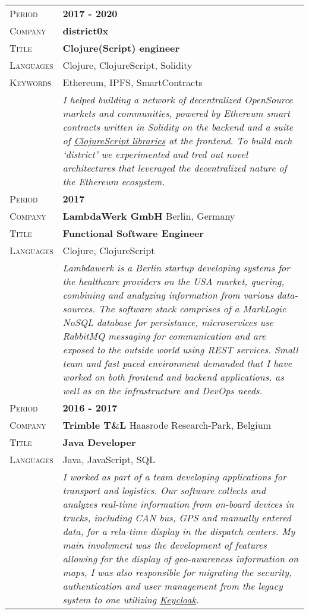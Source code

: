 \documentclass[a4paper, oneside, final]{scrartcl}
\newcommand{\gray}{\rowcolor[gray]{.90}}
\begin{document}
\begin{center}
\begin{tabularx}{1.0\linewidth}{>{\raggedleft\scshape}p{2cm}X}
\gray Period    & \textbf{2017 - 2020} \\
\gray Company  & \textbf{district0x} \\
\gray Title & \textbf{Clojure(Script) engineer} \\
\gray Languages & Clojure, ClojureScript, Solidity \\
\gray Keywords & Ethereum, IPFS, SmartContracts \\
\gray           &  {\textit{
    I helped building a network of decentralized OpenSource markets and communities, powered by Ethereum smart contracts written in Solidity on the backend and a suite of \href{https://github.com/district0x}{ClojureScript libraries} at the frontend.
    To build each `district' we experimented and tred out novel architectures that leveraged the decentralized nature of the Ethereum ecosystem.
}} \\

\gray Period    & \textbf{2017} \\
\gray Company  & \textbf{LambdaWerk GmbH} \hfill Berlin, Germany \\
\gray Title & \textbf{Functional Software Engineer} \\
\gray Languages & Clojure, ClojureScript \\
\gray           &  {\textit{Lambdawerk is a Berlin startup developing systems for the healthcare providers on the USA market, quering, combining and analyzing information from various data-sources.
The software stack comprises of a MarkLogic NoSQL database for persistance, microservices use RabbitMQ messaging for communication and are exposed to the outside world using REST services.
Small team and fast paced environment demanded that I have worked on both frontend and backend applications, as well as on the infrastructure and DevOps needs.
}} \\

\gray Period    & \textbf{2016 - 2017} \\
\gray Company  & \textbf{Trimble T\&L} \hfill Haasrode Research-Park, Belgium \\
\gray Title & \textbf{Java Developer} \\
\gray Languages & Java, JavaScript, SQL \\
\gray           &  {\textit{I worked as part of a team developing applications for transport and logistics.
Our software collects and analyzes real-time information from on-board devices in trucks, including CAN bus, GPS and manually entered data, for a rela-time display in the dispatch centers.
My main involvment was the development of features allowing for the display of geo-awareness information on maps,
I was also responsible for migrating the security, authentication and user management from the legacy system to one utilizing \href{http://www.keycloak.org/}{Keycloak}.}} \\


\end{tabularx}
\end{center}
\end{document}
